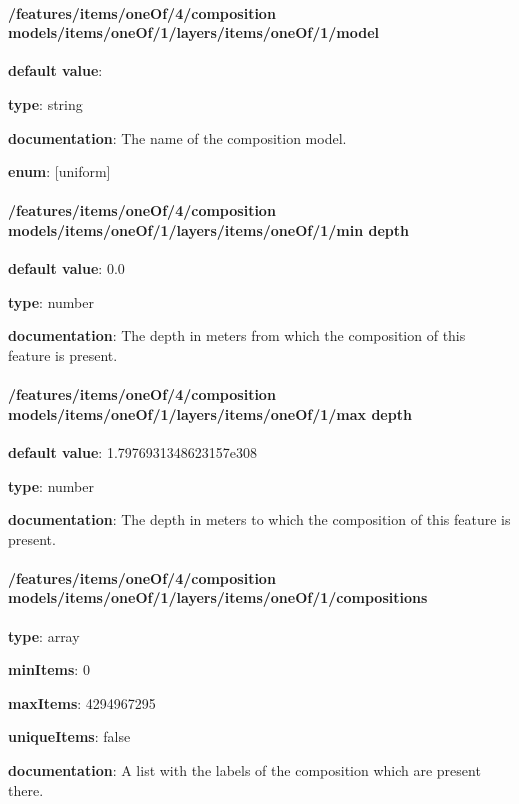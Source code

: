 \paragraph{/features/items/oneOf/4/composition models/items/oneOf/1/layers/items/oneOf/1/model} \begin{itemized}
\item {\bf default value}: 
\item {\bf type}: string
\item {\bf documentation}: The name of the composition model.
\item {\bf enum}: [uniform]\end{itemized}\paragraph{/features/items/oneOf/4/composition models/items/oneOf/1/layers/items/oneOf/1/min depth} \begin{itemized}
\item {\bf default value}: 0.0
\item {\bf type}: number
\item {\bf documentation}: The depth in meters from which the composition of this feature is present.
\end{itemized}\paragraph{/features/items/oneOf/4/composition models/items/oneOf/1/layers/items/oneOf/1/max depth} \begin{itemized}
\item {\bf default value}: 1.7976931348623157e308
\item {\bf type}: number
\item {\bf documentation}: The depth in meters to which the composition of this feature is present.
\end{itemized}\paragraph{/features/items/oneOf/4/composition models/items/oneOf/1/layers/items/oneOf/1/compositions} \begin{itemized}
\item {\bf type}: array
\item {\bf minItems}: 0
\item {\bf maxItems}: 4294967295
\item {\bf uniqueItems}: false
\item {\bf documentation}: A list with the labels of the composition which are present there.

\end{itemized}
